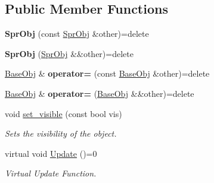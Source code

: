 \subsection*{Public Member Functions}
\begin{DoxyCompactItemize}
\item 
\hypertarget{classhelios_1_1_spr_obj_aa159cd49b979664b28ec44a6f7b53b19}{}{\bfseries Spr\+Obj} (const \hyperlink{classhelios_1_1_spr_obj}{Spr\+Obj} \&other)=delete\label{classhelios_1_1_spr_obj_aa159cd49b979664b28ec44a6f7b53b19}

\item 
\hypertarget{classhelios_1_1_spr_obj_ad08594d442321bf33eb06200f02aef86}{}{\bfseries Spr\+Obj} (\hyperlink{classhelios_1_1_spr_obj}{Spr\+Obj} \&\&other)=delete\label{classhelios_1_1_spr_obj_ad08594d442321bf33eb06200f02aef86}

\item 
\hypertarget{classhelios_1_1_spr_obj_ac7732ac1e0edb236c70d19e505b2cb75}{}\hyperlink{classhelios_1_1_base_obj}{Base\+Obj} \& {\bfseries operator=} (const \hyperlink{classhelios_1_1_base_obj}{Base\+Obj} \&other)=delete\label{classhelios_1_1_spr_obj_ac7732ac1e0edb236c70d19e505b2cb75}

\item 
\hypertarget{classhelios_1_1_spr_obj_a6ad34478fe2332df5ff439e4b65ceab5}{}\hyperlink{classhelios_1_1_base_obj}{Base\+Obj} \& {\bfseries operator=} (\hyperlink{classhelios_1_1_base_obj}{Base\+Obj} \&\&other)=delete\label{classhelios_1_1_spr_obj_a6ad34478fe2332df5ff439e4b65ceab5}

\item 
void \hyperlink{classhelios_1_1_spr_obj_a0fa23c9719b389a0261af6c6f0104672}{set\+\_\+visible} (const bool vis)
\begin{DoxyCompactList}\small\item\em Sets the visibility of the object. \end{DoxyCompactList}\item 
virtual void \hyperlink{classhelios_1_1_spr_obj_ad098d4bff19702f347fdf548576d02fd}{Update} ()=0
\begin{DoxyCompactList}\small\item\em Virtual Update Function. \end{DoxyCompactList}\end{DoxyCompactItemize}
